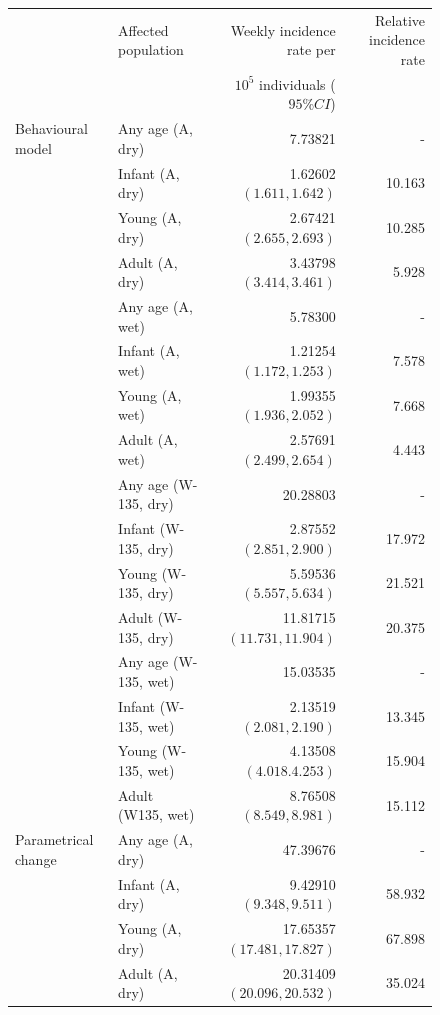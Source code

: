 \documentclass[10pt,a4paper]{article}
\begin{document}
\begin{figure}
	\begin{tabular}{l|l|r|r}
								& Affected population				& Weekly incidence rate per			& Relative incidence rate		\\
								&									& $10^5$ individuals ($95\% CI$)	&								\\ \hline
		Behavioural model		& Any age (A, dry)					& 7.73821							& -								\\
								& Infant (A, dry)					& 1.62602 $(1.611, 1.642)$			& 10.163						\\
								& Young (A, dry)					& 2.67421 $(2.655, 2.693)$			& 10.285						\\
								& Adult (A, dry)					& 3.43798 $(3.414, 3.461)$			& 5.928							\\
								& Any age (A, wet)					& 5.78300							& -								\\
								& Infant (A, wet)					& 1.21254 $(1.172, 1.253)$			& 7.578							\\
								& Young (A, wet)					& 1.99355 $(1.936, 2.052)$			& 7.668							\\
								& Adult (A, wet)					& 2.57691 $(2.499, 2.654)$			& 4.443							\\
								& Any age (W-135, dry)				& 20.28803							& -								\\
								& Infant (W-135, dry)				& 2.87552 $(2.851, 2.900)$			& 17.972						\\
								& Young (W-135, dry)				& 5.59536 $(5.557, 5.634)$			& 21.521						\\
								& Adult (W-135, dry)				& 11.81715 $(11.731, 11.904)$		& 20.375						\\
								& Any age (W-135, wet)				& 15.03535							& -								\\
								& Infant (W-135, wet)				& 2.13519 $(2.081, 2.190)$			& 13.345						\\
								& Young (W-135, wet)				& 4.13508 $(4.018. 4.253)$			& 15.904						\\
								& Adult (W135, wet)					& 8.76508 $(8.549, 8.981)$			& 15.112						\\
		Parametrical change		& Any age (A, dry)					& 47.39676							& -								\\
								& Infant (A, dry)					& 9.42910 $(9.348, 9.511)$			& 58.932						\\
								& Young (A, dry)					& 17.65357 $(17.481, 17.827)$		& 67.898						\\
								& Adult (A, dry)					& 20.31409 $(20.096, 20.532)$		& 35.024						\\

\end{tabular}
\end{figure}
\end{document}
